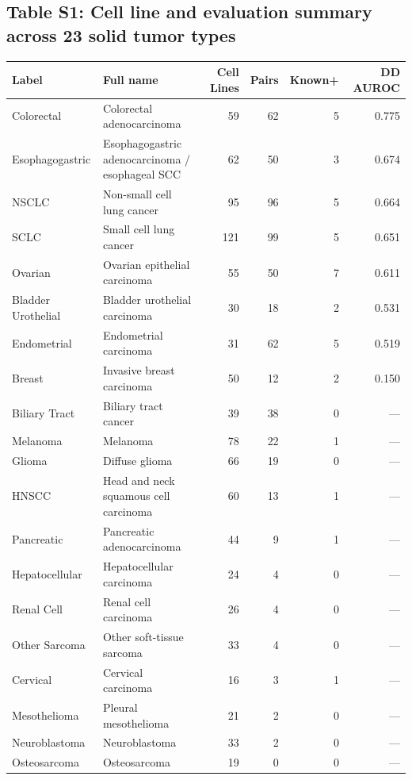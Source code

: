 \documentclass[11pt,a4paper]{article}
\begin{document}
\subsection{Table S1: Cell line and evaluation summary across 23 solid tumor types}
\begin{table}[H]
\centering
\footnotesize
\setlength{\tabcolsep}{4.5pt}
\begin{tabular}{llrrrr}
\toprule
\textbf{Label} & \textbf{Full name} & \textbf{Cell Lines} & \textbf{Pairs} & \textbf{Known+} & \textbf{DD AUROC} \\
\midrule
Colorectal & Colorectal adenocarcinoma & 59 & 62 & 5 & 0.775 \\
\midrule
Esophagogastric & \shortstack[l]{Esophagogastric adenocarcinoma /\\esophageal SCC} & 62 & 50 & 3 & 0.674 \\
NSCLC & Non-small cell lung cancer & 95 & 96 & 5 & 0.664 \\
SCLC & Small cell lung cancer & 121 & 99 & 5 & 0.651 \\
Ovarian & Ovarian epithelial carcinoma & 55 & 50 & 7 & 0.611 \\
Bladder Urothelial & Bladder urothelial carcinoma & 30 & 18 & 2 & 0.531 \\
Endometrial & Endometrial carcinoma & 31 & 62 & 5 & 0.519 \\
\midrule
Breast & Invasive breast carcinoma & 50 & 12 & 2 & 0.150 \\
\midrule
Biliary Tract & Biliary tract cancer & 39 & 38 & 0 & --- \\
Melanoma & Melanoma & 78 & 22 & 1 & --- \\
Glioma & Diffuse glioma & 66 & 19 & 0 & --- \\
HNSCC & Head and neck squamous cell carcinoma & 60 & 13 & 1 & --- \\
Pancreatic & Pancreatic adenocarcinoma & 44 & 9 & 1 & --- \\
Hepatocellular & Hepatocellular carcinoma & 24 & 4 & 0 & --- \\
Renal Cell & Renal cell carcinoma & 26 & 4 & 0 & --- \\
Other Sarcoma & Other soft-tissue sarcoma & 33 & 4 & 0 & --- \\
Cervical & Cervical carcinoma & 16 & 3 & 1 & --- \\
Mesothelioma & Pleural mesothelioma & 21 & 2 & 0 & --- \\
Neuroblastoma & Neuroblastoma & 33 & 2 & 0 & --- \\
Osteosarcoma & Osteosarcoma & 19 & 0 & 0 & --- \\

\end{tabular}
\end{table}
\end{document}
